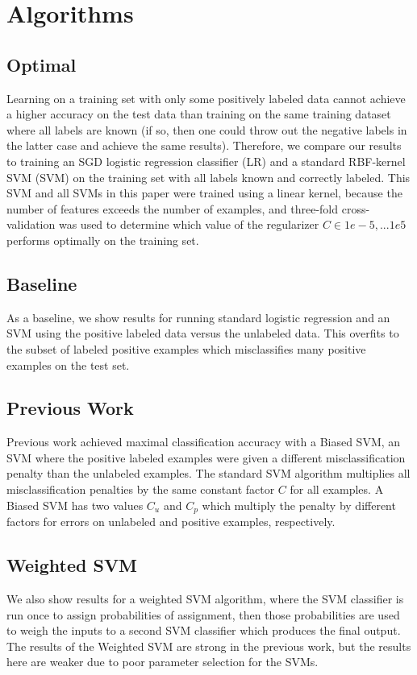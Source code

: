 \documentclass{article}
\begin{document}
\section{Algorithms}

\subsection{Optimal}
Learning on a training set with only some positively labeled data cannot achieve a higher accuracy on the test data than training on the same training dataset where all labels are known (if so, then one could throw out the negative labels in the latter case and achieve the same results).  Therefore, we compare our results to training an SGD logistic regression classifier (LR) and a standard RBF-kernel SVM (SVM) on the training set with all labels known and correctly labeled.  This SVM and all SVMs in this paper were trained using a linear kernel, because the number of features exceeds the number of examples, and three-fold cross-validation was used to determine which value of the regularizer $C \in {1e-5, ... 1e5}$ performs optimally on the training set.

\subsection{Baseline}

As a baseline, we show results for running standard logistic regression and an SVM using the positive labeled data versus the unlabeled data.  This overfits to the subset of labeled positive examples which misclassifies many positive examples on the test set.


\subsection{Previous Work}
Previous work\cite{elkan08} achieved maximal classification accuracy with a Biased SVM, an SVM where the positive labeled examples were given a different misclassification penalty than the unlabeled examples.  The standard SVM algorithm multiplies all misclassification penalties by the same constant factor $C$ for all examples. A Biased SVM has two values $C_u$ and $C_p$ which multiply the penalty by different factors for errors on unlabeled and positive examples, respectively.

\subsection{Weighted SVM}
We also show results for a weighted SVM algorithm, where the SVM classifier is run once to assign probabilities of assignment, then those probabilities are used to weigh the inputs to a second SVM classifier which produces the final output.  The results of the Weighted SVM are strong in the previous work, but the results here are weaker  due to poor parameter selection for the SVMs.
\end{document}
